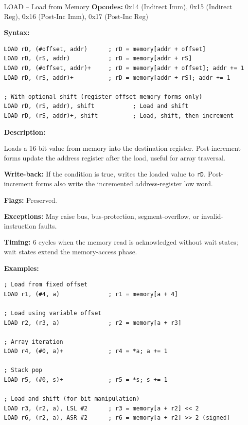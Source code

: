 \begin{instructionbox}{LOAD -- Load from Memory}
	\textbf{Opcodes:} 0x14 (Indirect Imm), 0x15 (Indirect Reg), 0x16 (Post-Inc Imm), 0x17 (Post-Inc Reg)

	\textbf{Syntax:}
	\begin{lstlisting}
LOAD rD, (#offset, addr)      ; rD = memory[addr + offset]
LOAD rD, (rS, addr)           ; rD = memory[addr + rS]
LOAD rD, (#offset, addr)+     ; rD = memory[addr + offset]; addr += 1
LOAD rD, (rS, addr)+          ; rD = memory[addr + rS]; addr += 1

; With optional shift (register-offset memory forms only)
LOAD rD, (rS, addr), shift           ; Load and shift
LOAD rD, (rS, addr)+, shift          ; Load, shift, then increment
\end{lstlisting}

	\textbf{Description:}

	Loads a 16-bit value from memory into the destination register. Post-increment forms update the address register after
	the load, useful for array traversal.

	\textbf{Write-back:} If the condition is true, writes the loaded value to \texttt{rD}. Post-increment forms also write
	the incremented address-register low word.

	\textbf{Flags:} Preserved.

	\textbf{Exceptions:} May raise bus, bus-protection, segment-overflow, or invalid-instruction faults.

	\textbf{Timing:} 6 cycles when the memory read is acknowledged without wait states; wait states extend the memory-access
	phase.

	\textbf{Examples:}
	\begin{lstlisting}
; Load from fixed offset
LOAD r1, (#4, a)              ; r1 = memory[a + 4]

; Load using variable offset
LOAD r2, (r3, a)              ; r2 = memory[a + r3]

; Array iteration
LOAD r4, (#0, a)+             ; r4 = *a; a += 1

; Stack pop
LOAD r5, (#0, s)+             ; r5 = *s; s += 1

; Load and shift (for bit manipulation)
LOAD r3, (r2, a), LSL #2      ; r3 = memory[a + r2] << 2
LOAD r6, (r2, a), ASR #2      ; r6 = memory[a + r2] >> 2 (signed)
\end{lstlisting}

\end{instructionbox}

